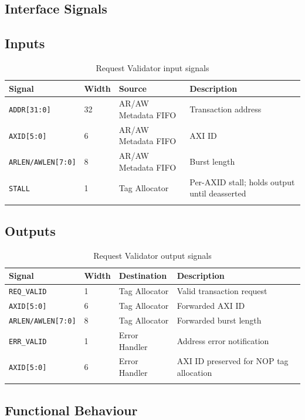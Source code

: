 \subsection{Interface Signals}

\subsection{Inputs}

\begin{longtable}{llll}
\toprule
\textbf{Signal} & \textbf{Width} & \textbf{Source} & \textbf{Description} \\
\midrule
\texttt{ADDR[31:0]}        & 32 & AR/AW Metadata FIFO & Transaction address \\
\texttt{AXID[5:0]}         & 6  & AR/AW Metadata FIFO & AXI ID \\
\texttt{ARLEN/AWLEN[7:0]}  & 8  & AR/AW Metadata FIFO & Burst length \\
\texttt{STALL}             & 1  & Tag Allocator       & Per-AXID stall; holds output until deasserted \\
\bottomrule
\caption{Request Validator input signals}
\end{longtable}

\subsection{Outputs}

\begin{longtable}{llll}
\toprule
\textbf{Signal} & \textbf{Width} & \textbf{Destination} & \textbf{Description} \\
\midrule
\texttt{REQ\_VALID}       & 1 & Tag Allocator & Valid transaction request \\
\texttt{AXID[5:0]}        & 6 & Tag Allocator & Forwarded AXI ID \\
\texttt{ARLEN/AWLEN[7:0]} & 8 & Tag Allocator & Forwarded burst length \\
\texttt{ERR\_VALID}       & 1 & Error Handler & Address error notification \\
\texttt{AXID[5:0]}        & 6 & Error Handler & AXI ID preserved for NOP tag allocation \\
\bottomrule
\caption{Request Validator output signals}
\end{longtable}

\subsection{Functional Behaviour}

